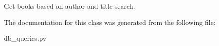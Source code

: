 \label{classsrc_1_1db__queries_1_1sqlite_aef554970f084d1bc7d9a70eff784e9c0}
\begin{DoxyVerb}
Get books based on author and title search.

\end{DoxyVerb}
 

The documentation for this class was generated from the following file:\begin{DoxyCompactItemize}
\item 
db\_\-queries.py\end{DoxyCompactItemize}
